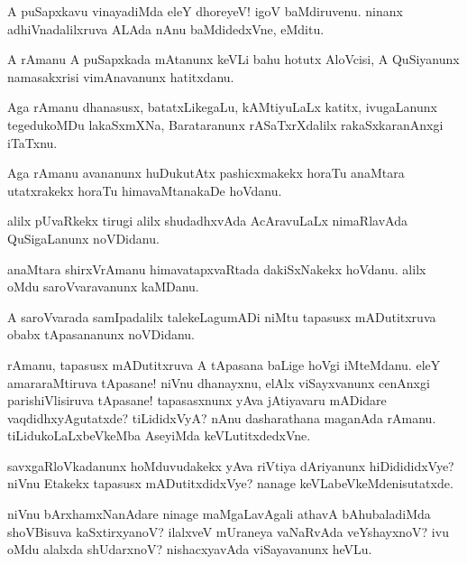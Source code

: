 \begin{mng}
A puSapxkavu vinayadiMda eleY dhoreyeV! igoV baMdiruvenu. ninanx adhiVnadalilxruva ALAda nAnu baMdidedxVne, eMditu.
\end{mng}

\begin{mng}
A rAmanu A puSapxkada mAtanunx keVLi bahu hotutx AloVcisi, A QuSiyanunx namasakxrisi vimAnavanunx hatitxdanu.
\end{mng}

\begin{mng}
Aga rAmanu dhanasusx, batatxLikegaLu, kAMtiyuLaLx katitx, ivugaLanunx tegedukoMDu lakaSxmXNa, Barataranunx rASaTxrXdalilx rakaSxkaranAnxgi iTaTxnu.
\end{mng}

\begin{mng}
Aga rAmanu avananunx huDukutAtx pashicxmakekx horaTu anaMtara utatxrakekx horaTu himavaMtanakaDe hoVdanu.
\end{mng}

\begin{mng}
alilx pUvaRkekx tirugi alilx shudadhxvAda AcAravuLaLx nimaRlavAda QuSigaLanunx noVDidanu.
\end{mng}

\begin{mng}
anaMtara shirxVrAmanu himavatapxvaRtada dakiSxNakekx hoVdanu. alilx oMdu saroVvaravanunx kaMDanu.
\end{mng}

\begin{mng}
A saroVvarada samIpadalilx talekeLagumADi niMtu tapasusx mADutitxruva obabx tApasananunx noVDidanu.
\end{mng}

\begin{mng}
rAmanu, tapasusx mADutitxruva A tApasana baLige hoVgi iMteMdanu. eleY amararaMtiruva tApasane! niVnu dhanayxnu, elAlx viSayxvanunx cenAnxgi parishiVlisiruva tApasane! tapasasxnunx yAva jAtiyavaru mADidare vaqdidhxyAgutatxde? tiLididxVyA? nAnu dasharathana maganAda rAmanu. tiLidukoLaLxbeVkeMba AseyiMda keVLutitxdedxVne.
\end{mng}

\begin{mng}
savxgaRloVkadanunx hoMduvudakekx yAva riVtiya dAriyanunx hiDidididxVye? niVnu Etakekx tapasusx mADutitxdidxVye? nanage keVLabeVkeMdenisutatxde.
\end{mng}

\begin{mng}
niVnu bArxhamxNanAdare ninage maMgaLavAgali athavA bAhubaladiMda shoVBisuva kaSxtirxyanoV? ilalxveV mUraneya vaNaRvAda veYshayxnoV? ivu oMdu alalxda shUdarxnoV? nishacxyavAda viSayavanunx heVLu.
\end{mng}

